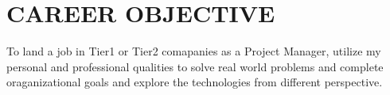 \documentclass[paper=a4,fontsize=12pt]{scrartcl}
\newcommand{\NewPart}[1]{\section*{\uppercase{#1}}}
\begin{document}
\NewPart{Career Objective}

To land a job in Tier1 or Tier2 comapanies as a Project Manager, utilize my personal and professional qualities to solve real world problems and complete oraganizational goals and explore the technologies from different perspective. 
\end{document}
